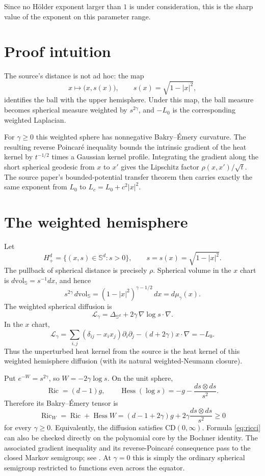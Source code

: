 \documentclass[11pt]{article}
\newcommand{\Sph}{\mathbb S}
\begin{document}
Since no H\"older exponent larger than $1$ is under consideration, this is
the sharp value of the exponent on this parameter range.

\section{Proof intuition}

The source's distance is not ad hoc: the map
\[
 x\longmapsto \bigl(x,s(x)\bigr),
 \qquad s(x)=\sqrt{1-|x|^2},
\]
identifies the ball with the upper hemisphere.  Under this map, the ball
measure becomes spherical measure weighted by $s^{2\gamma}$, and $-L_0$ is
the corresponding weighted Laplacian.

For $\gamma\ge0$ this weighted sphere has nonnegative Bakry--\'Emery
curvature.  The resulting reverse Poincar\'e inequality bounds the intrinsic
gradient of the heat kernel by $t^{-1/2}$ times a Gaussian kernel profile.
Integrating the gradient along the short spherical geodesic from $x$ to
$x'$ gives the Lipschitz factor $\rho(x,x')/\sqrt t$.  The source paper's
bounded-potential transfer theorem then carries exactly the same exponent
from $L_0$ to $L_c=L_0+c^2|x|^2$.

\section{The weighted hemisphere}

Let
\[
 H^d_+=\{(x,s)\in\Sph^d:s>0\},\qquad s=s(x)=\sqrt{1-|x|^2}.
\]
The pullback of spherical distance is precisely $\rho$.  Spherical volume in
the $x$ chart is $d\mathrm{vol}_{\Sph}=s^{-1}dx$, and hence
\begin{equation}\label{eq:measure}
 s^{2\gamma}\,d\mathrm{vol}_{\Sph}
       =(1-|x|^2)^{\gamma-1/2}\,dx=d\mu_\gamma(x).
\end{equation}
The weighted spherical diffusion is
\[
 \mathcal L_\gamma
   =\Delta_{\Sph^d}+2\gamma\,\nabla\log s\cdot\nabla.
\]
In the $x$ chart,
\[
 \mathcal L_\gamma
 =\sum_{i,j}(\delta_{ij}-x_ix_j)\partial_i\partial_j
      -(d+2\gamma)x\cdot\nabla=-L_0.
\]
Thus the unperturbed heat kernel from the source is the heat kernel of this
weighted hemisphere diffusion (with its natural weighted-Neumann closure).

Put $e^{-W}=s^{2\gamma}$, so $W=-2\gamma\log s$.  On the unit sphere,
\[
 \operatorname{Ric}=(d-1)g,
 \qquad \operatorname{Hess}(\log s)
       =-g-\frac{ds\otimes ds}{s^2}.
\]
Therefore its Bakry--\'Emery tensor is
\begin{equation}\label{eq:ricci}
 \operatorname{Ric}_W
 =\operatorname{Ric}+\operatorname{Hess}W
 =(d-1+2\gamma)g+2\gamma\frac{ds\otimes ds}{s^2}\ge0
\end{equation}
for every $\gamma\ge0$.  Equivalently, the diffusion satisfies
$\mathrm{CD}(0,\infty)$.  Formula \eqref{eq:ricci} can also be checked
directly on the polynomial core by the Bochner identity.  The associated
gradient inequality and its reverse-Poincar\'e consequence pass to the
closed Markov semigroup; see \cite[Chapters 3--4]{BGL2014}.  At $\gamma=0$
this is simply the ordinary spherical semigroup restricted to functions even
across the equator.
\end{document}
